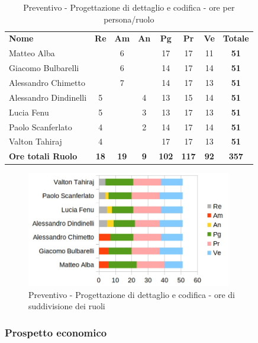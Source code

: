 		\begin{table} [h!]
			\begin{center}
				\begin{tabular} { m{3.5cm} c c c c c c c }
					\rowcolor{lightgray}
					\textbf{Nome} & \textbf{Re} & \textbf{Am} & \textbf{An} & \textbf{Pg} & \textbf{Pr} & \textbf{Ve} & \textbf{Totale} \\
					Matteo Alba & & 6 & & 17 & 17 & 11 & \textbf{51} \\
					Giacomo Bulbarelli & & 6 & & 14 & 17 & 14 & \textbf{51} \\
					Alessandro Chimetto & & 7 & & 14 & 17 & 13 & \textbf{51} \\
					Alessandro Dindinelli & 5 & & 4 & 13 & 15 & 14 & \textbf{51} \\
					Lucia Fenu & 5 & & 3 & 13 & 17 & 13 & \textbf{51} \\
					Paolo Scanferlato & 4 & & 2 & 14 & 17 & 14 & \textbf{51} \\
					Valton Tahiraj & 4 & & & 17 & 17 & 13 & \textbf{51} \\
					\textbf{Ore totali Ruolo} & \textbf{18} & \textbf{19} & \textbf{9} & \textbf{102} & \textbf{117}& \textbf{92} & \textbf{357}
				\end{tabular}
				\caption{Preventivo - Progettazione di dettaglio e codifica - ore per persona/ruolo}
			\end{center}
		\end{table}
	
		\begin{figure} [h!]
			\centering
			\includegraphics[width=0.8\textwidth]{res/img/grafici/progettazione_di_dettaglio_e_codifica_ore_ruolo.jpg}
			\caption{Preventivo - Progettazione di dettaglio e codifica - ore di suddivisione dei ruoli} 
		\end{figure}
	
	\newpage
	
	\subsubsection{Prospetto economico}
	
